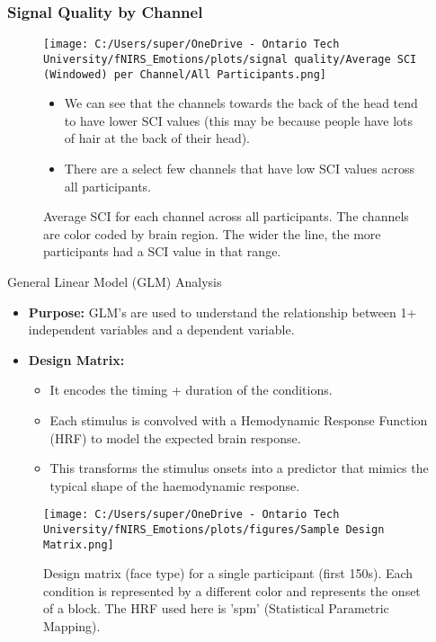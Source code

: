 \documentclass{beamer}
\begin{document}
\begin{frame}
    \frametitle{Signal Quality by Channel}
    \begin{figure}
        \texttt{[image: C:/Users/super/OneDrive - Ontario Tech University/fNIRS\_Emotions/plots/signal quality/Average SCI (Windowed) per Channel/All Participants.png]}
        \caption{Average SCI for each channel across all participants. The channels are color coded by brain region. The wider the line, the more participants had a SCI value in that range.}
            \begin{itemize}
                \item We can see that the channels towards the back of the head tend to have lower SCI values (this may be because people have lots of hair at the back of their head).
                \item There are a select few channels that have low SCI values across all participants. 
            \end{itemize}
    \end{figure}
\end{frame}

\begin{frame}{General Linear Model (GLM) Analysis}
    \begin{itemize}
        \item \textbf{Purpose:} GLM's are used to understand the relationship between 1+ independent variables and a dependent variable.
        \item \textbf{Design Matrix:}
        \begin{itemize}
            \item It encodes the timing + duration of the conditions. 
            \item Each stimulus is convolved with a Hemodynamic Response Function (HRF) to model the expected brain response. 
            \item This transforms the stimulus onsets into a predictor that mimics the typical shape of the haemodynamic response.
        \end{itemize}
    \end{itemize}
    \begin{figure}
        \texttt{[image: C:/Users/super/OneDrive - Ontario Tech University/fNIRS\_Emotions/plots/figures/Sample Design Matrix.png]}
        \caption{Design matrix (face type) for a single participant (first 150s). Each condition is represented by a different color and represents the onset of a block. The HRF used here is 'spm' (Statistical Parametric Mapping).}
    \end{figure}
\end{frame}
\end{document}
